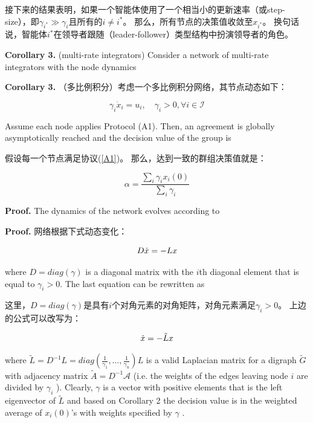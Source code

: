 \documentclass{article}
\begin{document}
接下来的结果表明，如果一个智能体使用了一个相当小的更新速率（或step-size），即$\gamma_{i^*}\gg\gamma_i$且所有的$i\ne i^*$。
那么，所有节点的决策值收敛至$x_{i^*}$。
换句话说，智能体$i^*$在领导者跟随（leader-follower）类型结构中扮演领导者的角色。

{\color[gray]{0.5}
\noindent \textbf{Corollary 3.} (multi-rate integrators) Consider a network of multi-rate integrators with the node dynamics
}

\noindent \textbf{Corollary 3.} （多比例积分）考虑一个多比例积分网络，其节点动态如下：

\begin{equation}
    \gamma_i \dot{x}_i=u_i,\quad \gamma_i>0,\forall i \in \mathcal{I}
    \tag{20}
    \label{20}
\end{equation}

{\color[gray]{0.5}
\noindent Assume each node applies Protocol (A1). 
Then, an agreement is globally asymptotically reached and the decision value of the group is
}

\noindent 假设每一个节点满足协议(\ref{A1})。
那么，达到一致的群组决策值就是：

\begin{equation}
    \alpha = \frac{\sum_i \gamma_ix_i(0)}{\sum_i\gamma_i}
    \tag{21}
    \label{21}
\end{equation}

{\color[gray]{0.5}
\noindent \textbf{Proof.} The dynamics of the network evolves according to
}

\noindent \textbf{Proof.} 网络根据下式动态变化：

\begin{equation}
    D\dot{x} = -Lx
    \notag
\end{equation}

{\color[gray]{0.5}
\noindent where $D=diag(\gamma)$ is a diagonal matrix with the $i$th diagonal element that is equal to $\gamma_i>0$. 
The last equation can be rewritten as
}

\noindent 这里，$D=diag(\gamma)$是具有$i$个对角元素的对角矩阵，对角元素满足$\gamma_i>0$。
上边的公式可以改写为：

\begin{equation}
    \dot{x} = -\tilde{L}x
    \notag
\end{equation}

{\color[gray]{0.5}
\noindent where $\tilde{L} = D^{-1}L = diag(\frac{1}{\gamma_1},\dots,\frac{1}{\gamma_n})L$ is a valid Laplacian matrix for a digraph $\tilde{G}$ with adjacency matrix $\tilde{A}=D^{-1}\mathcal{A}$ (i.e. the weights of the edges leaving node $i$ are divided by $\gamma_i$ ). 
{\color{green}Clearly, $\gamma$ is a vector with positive elements that is the left eigenvector of $\tilde{L}$ and based on Corollary 2 the decision value is in the weighted average of $x_i(0)$’s with weights speciﬁed by $\gamma$} .
}
\end{document}
